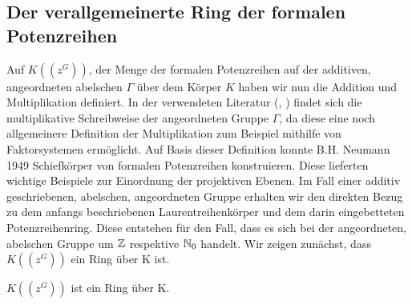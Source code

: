 \subsection{Der verallgemeinerte Ring der formalen Potenzreihen} 
Auf $K\left(\left(z^{G}\right)\right)$, der Menge der formalen Potenzreihen auf der additiven, angeordneten abelschen $\Gamma$ über dem Körper $K$ haben wir nun die Addition und Multiplikation definiert. In der verwendeten Literatur (\cite{priesscrampe83}, \cite{fuchs66}) findet sich die multiplikative Schreibweise der angeordneten Gruppe $\Gamma$, da diese eine noch allgemeinere Definition der Multiplikation zum Beispiel mithilfe von Faktorsystemen ermöglicht. Auf Basis dieser Definition konnte B.H. Neumann 1949 Schiefkörper von formalen Potenzreihen konstruieren. Diese lieferten wichtige Beispiele zur Einordnung der projektiven Ebenen.
Im Fall einer additiv geschriebenen, abelschen, angeordneten Gruppe erhalten wir den direkten Bezug zu dem anfangs beschriebenen Laurentreihenkörper und dem darin eingebetteten Potenzreihenring. Diese entstehen für den Fall, dass es sich bei der angeordneten, abelschen Gruppe um $\mathbb{Z}$ respektive $\mathbb{N}_0$ handelt. 
Wir zeigen zunächst, dass $K\left(\left(z^{G}\right)\right)$ ein Ring über K ist.
%
%
\begin{satz}
$K\left(\left(z^{G}\right)\right)$ ist ein Ring über K. 
\end{satz}
